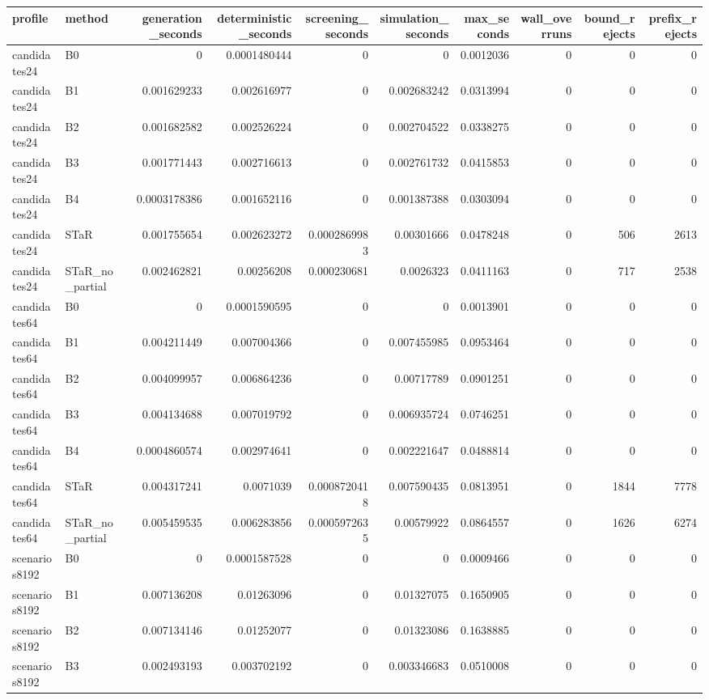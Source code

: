 \begin{tabular}{llrrrrrrrr}
\hline
profile & method & generation\_seconds & deterministic\_seconds & screening\_seconds & simulation\_seconds & max\_seconds & wall\_overruns & bound\_rejects & prefix\_rejects \\
\hline
candidates24 & B0 & 0 & 0.0001480444 & 0 & 0 & 0.0012036 & 0 & 0 & 0 \\
candidates24 & B1 & 0.001629233 & 0.002616977 & 0 & 0.002683242 & 0.0313994 & 0 & 0 & 0 \\
candidates24 & B2 & 0.001682582 & 0.002526224 & 0 & 0.002704522 & 0.0338275 & 0 & 0 & 0 \\
candidates24 & B3 & 0.001771443 & 0.002716613 & 0 & 0.002761732 & 0.0415853 & 0 & 0 & 0 \\
candidates24 & B4 & 0.0003178386 & 0.001652116 & 0 & 0.001387388 & 0.0303094 & 0 & 0 & 0 \\
candidates24 & STaR & 0.001755654 & 0.002623272 & 0.0002869983 & 0.00301666 & 0.0478248 & 0 & 506 & 2613 \\
candidates24 & STaR\_no\_partial & 0.002462821 & 0.00256208 & 0.000230681 & 0.0026323 & 0.0411163 & 0 & 717 & 2538 \\
candidates64 & B0 & 0 & 0.0001590595 & 0 & 0 & 0.0013901 & 0 & 0 & 0 \\
candidates64 & B1 & 0.004211449 & 0.007004366 & 0 & 0.007455985 & 0.0953464 & 0 & 0 & 0 \\
candidates64 & B2 & 0.004099957 & 0.006864236 & 0 & 0.00717789 & 0.0901251 & 0 & 0 & 0 \\
candidates64 & B3 & 0.004134688 & 0.007019792 & 0 & 0.006935724 & 0.0746251 & 0 & 0 & 0 \\
candidates64 & B4 & 0.0004860574 & 0.002974641 & 0 & 0.002221647 & 0.0488814 & 0 & 0 & 0 \\
candidates64 & STaR & 0.004317241 & 0.0071039 & 0.0008720418 & 0.007590435 & 0.0813951 & 0 & 1844 & 7778 \\
candidates64 & STaR\_no\_partial & 0.005459535 & 0.006283856 & 0.0005972635 & 0.00579922 & 0.0864557 & 0 & 1626 & 6274 \\
scenarios8192 & B0 & 0 & 0.0001587528 & 0 & 0 & 0.0009466 & 0 & 0 & 0 \\
scenarios8192 & B1 & 0.007136208 & 0.01263096 & 0 & 0.01327075 & 0.1650905 & 0 & 0 & 0 \\
scenarios8192 & B2 & 0.007134146 & 0.01252077 & 0 & 0.01323086 & 0.1638885 & 0 & 0 & 0 \\
scenarios8192 & B3 & 0.002493193 & 0.003702192 & 0 & 0.003346683 & 0.0510008 & 0 & 0 & 0 \\

\end{tabular}
